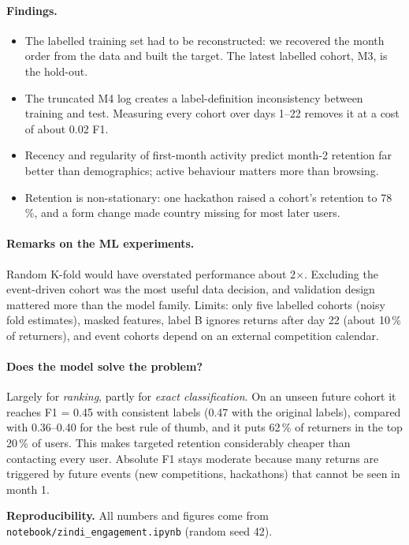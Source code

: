 \documentclass[11pt,a4paper]{article}
\newcommand{\code}[1]{\texttt{#1}}
\begin{document}
\paragraph{Findings.}
\begin{itemize}
  \item The labelled training set had to be reconstructed: we recovered the month order from the data and built the target. The latest labelled cohort, M3, is the hold-out.
  \item The truncated M4 log creates a label-definition inconsistency between training and test. Measuring every cohort over days 1--22 removes it at a cost of about 0.02 F1.
  \item Recency and regularity of first-month activity predict month-2 retention far better than demographics; active behaviour matters more than browsing.
  \item Retention is non-stationary: one hackathon raised a cohort's retention to 78\,\%, and a form change made country missing for most later users.
\end{itemize}

\paragraph{Remarks on the ML experiments.}
Random K-fold would have overstated performance about 2$\times$. Excluding the event-driven cohort was the most useful data decision,
and validation design mattered more than the model family. Limits: only five labelled cohorts (noisy fold estimates), masked features,
label B ignores returns after day 22 (about 10\,\% of returners), and event cohorts depend on an external competition calendar.

\paragraph{Does the model solve the problem?}
Largely for \emph{ranking}, partly for \emph{exact classification}. On an unseen future cohort it reaches F1 = 0.45 with consistent labels
(0.47 with the original labels), compared with 0.36--0.40 for the best rule of thumb, and it puts 62\,\% of returners in the top 20\,\% of users.
This makes targeted retention considerably cheaper than contacting every user.
Absolute F1 stays moderate because many returns are triggered by future events (new competitions, hackathons) that cannot be seen in month 1.

\vspace{6pt}\noindent\small\textbf{Reproducibility.} All numbers and figures come from \code{notebook/zindi\_engagement.ipynb} (random seed 42).
\end{document}
